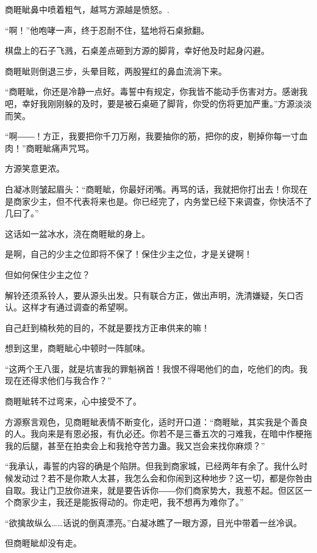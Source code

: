 
\begin{this_body}

商睚眦鼻中喷着粗气，越骂方源越是愤怒。.

“啊！”他咆哮一声，终于忍耐不住，猛地将石桌掀翻。

棋盘上的石子飞溅，石桌差点砸到方源的脚背，幸好他及时起身闪避。

商睚眦则倒退三步，头晕目眩，两股猩红的鼻血流淌下来。

“商睚眦，你还是冷静一点好。毒誓中有规定，你我皆不能动手伤害对方。感谢我吧，幸好我刚刚躲的及时，要是被石桌砸了脚背，你受的伤将更加严重。”方源淡淡而笑。

“啊――！方正，我要把你千刀万剐，我要抽你的筋，把你的皮，剔掉你每一寸血肉！”商睚眦痛声咒骂。

方源笑意更浓。

白凝冰则皱起眉头：“商睚眦，你最好闭嘴。再骂的话，我就把你打出去！你现在是商家少主，但不代表将来也是。你已经完了，内务堂已经下来调查，你快活不了几曰了。”

这话如一盆冰水，浇在商睚眦的身上。

是啊，自己的少主之位即将不保了！保住少主之位，才是关键啊！

但如何保住少主之位？

解铃还须系铃人，要从源头出发。只有联合方正，做出声明，洗清嫌疑，矢口否认。这样才有通过调查的希望啊。

自己赶到楠秋苑的目的，不就是要找方正串供来的嘛！

想到这里，商睚眦心中顿时一阵腻味。

“这两个王八蛋，就是坑害我的罪魁祸首！我恨不得喝他们的血，吃他们的肉。我现在还得求他们与我合作？”

商睚眦转不过弯来，心中接受不了。

方源察言观色，见商睚眦表情不断变化，适时开口道：“商睚眦，其实我是个善良的人。我向来是有恩必报，有仇必还。你若不是三番五次的刁难我，在暗中作梗拖我的后腿，甚至在拍卖会上和我抢夺苦力蛊。我又岂会来找你麻烦？”

“我承认，毒誓的内容的确是个陷阱。但我到商家城，已经两年有余了。我什么时候发动过？若不是你欺人太甚，我怎么会和你闹到这种地步？这一切，都是你咎由自取。我让门卫放你进来，就是要告诉你――你们商家势大，我惹不起。但区区一个商家少主，我还是能扳得动的。你走吧，我不想再为难你了。”

“欲擒故纵么……话说的倒真漂亮。”白凝冰瞧了一眼方源，目光中带着一丝冷讽。

但商睚眦却没有走。


\end{this_body}
